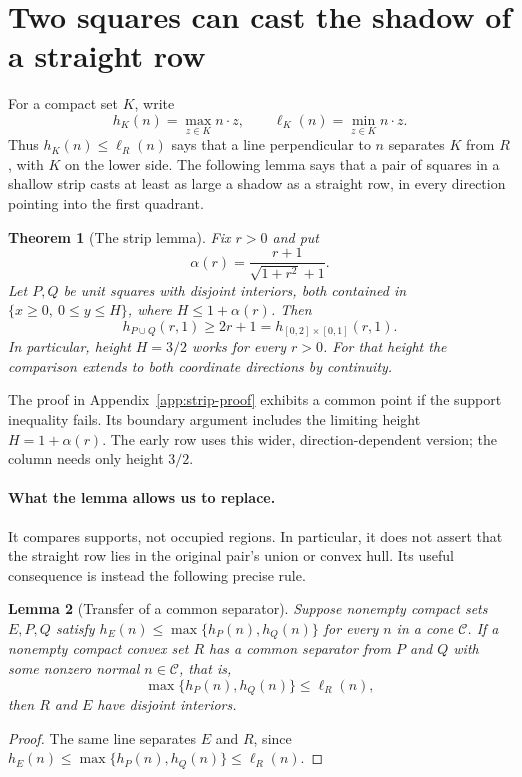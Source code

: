 \documentclass[11pt]{article}
\newtheorem{theorem}{Theorem}[section]
\newtheorem{lemma}[theorem]{Lemma}
\begin{document}
\section{Two squares can cast the shadow of a straight row}
\label{sec:strip}
For a compact set $K$, write
\[
 h_K(n)=\max_{z\in K}n\cdot z,
 \qquad \ell_K(n)=\min_{z\in K}n\cdot z.
\]
Thus $h_K(n)\le\ell_R(n)$ says that a line perpendicular to $n$
separates $K$ from $R$, with $K$ on the lower side.  The following
lemma says that a pair of squares in a shallow strip casts at least as
large a shadow as a straight row, in every direction pointing into the
first quadrant.

\begin{theorem}[The strip lemma]\label{thm:strip}\label{lem:direction-strip}
Fix $r>0$ and put
\[
 \alpha(r)=\frac{r+1}{\sqrt{1+r^2}+1}.
\]
Let $P,Q$ be unit squares with disjoint interiors, both contained in
$\{x\ge0,\ 0\le y\le H\}$, where $H\le1+\alpha(r)$. Then
\[
 h_{P\cup Q}(r,1)\ge2r+1
     =h_{[0,2]\times[0,1]}(r,1).
\]
In particular, height $H=3/2$ works for every $r>0$.
For that height the comparison extends to both coordinate directions
by continuity.
\end{theorem}

The proof in Appendix~\ref{app:strip-proof} exhibits a common point if
the support inequality fails. Its boundary argument includes the limiting
height $H=1+\alpha(r)$. The early row uses this wider, direction-dependent
version; the column needs only height $3/2$.

\paragraph{What the lemma allows us to replace.}
It compares supports, not occupied regions. In particular, it does not
assert that the straight row lies in the original pair's union or convex
hull. Its useful consequence is instead the following precise rule.

\begin{lemma}[Transfer of a common separator]
\label{lem:virtual-transfer}
Suppose nonempty compact sets $E,P,Q$ satisfy
$h_E(n)\le\max\{h_P(n),h_Q(n)\}$ for every $n$ in a cone $\mathcal C$.
If a nonempty compact convex set $R$ has a common separator from $P$ and $Q$ with some
nonzero normal $n\in\mathcal C$, that is,
\[
 \max\{h_P(n),h_Q(n)\}\le\ell_R(n),
\]
then $R$ and $E$ have disjoint interiors.
\end{lemma}
\begin{proof}
The same line separates $E$ and $R$, since
$h_E(n)\le\max\{h_P(n),h_Q(n)\}\le\ell_R(n)$.
\end{proof}
\end{document}
